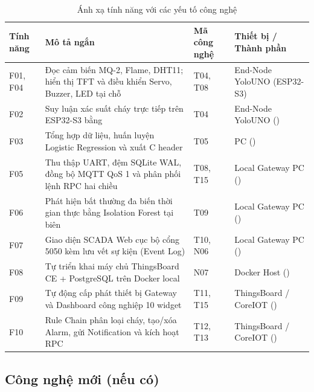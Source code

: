 \begin{table}[htbp]
  \centering
  \caption{Ánh xạ tính năng với các yếu tố công nghệ}
  \label{tab:anh-xa-tinh-nang}
  {\small
  \setlength{\tabcolsep}{4pt}
  \renewcommand{\arraystretch}{1.22}
  \begin{tabularx}{\textwidth}{|C{0.10\textwidth}|Y|C{0.15\textwidth}|L{0.30\textwidth}|}
    \hline
    \textbf{Tính năng} & \textbf{Mô tả ngắn} & \textbf{Mã công nghệ} & \textbf{Thiết bị / Thành phần} \\
    \hline
    F01, F04 & Đọc cảm biến MQ-2, Flame, DHT11; hiển thị TFT và điều khiển Servo, Buzzer, LED tại chỗ & T04, T08 & End-Node YoloUNO (ESP32-S3) \\
    \hline
    F02 & Suy luận xác suất cháy trực tiếp trên ESP32-S3 bằng  & T04 & End-Node YoloUNO () \\
    \hline
    F03 & Tổng hợp dữ liệu, huấn luyện Logistic Regression và xuất C header & T05 & PC () \\
    \hline
    F05 & Thu thập UART, đệm SQLite WAL, đồng bộ MQTT QoS 1 và phân phối lệnh RPC hai chiều & T08, T15 & Local Gateway PC () \\
    \hline
    F06 & Phát hiện bất thường đa biến thời gian thực bằng Isolation Forest tại biên & T09 & Local Gateway PC () \\
    \hline
    F07 & Giao diện SCADA Web cục bộ cổng 5050 kèm lưu vết sự kiện (Event Log) & T10, N06 & Local Gateway PC () \\
    \hline
    F08 & Tự triển khai máy chủ ThingsBoard CE + PostgreSQL trên Docker local & N07 & Docker Host () \\
    \hline
    F09 & Tự động cấp phát thiết bị Gateway và Dashboard công nghiệp 10 widget & T11, T15 & ThingsBoard / CoreIOT () \\
    \hline
    F10 & Rule Chain phân loại cháy, tạo/xóa Alarm, gửi Notification và kích hoạt RPC & T12, T13 & ThingsBoard / CoreIOT () \\
    \hline
  \end{tabularx}
  }
\end{table}

\subsection{Công nghệ mới (nếu có)}
\label{subsec:cong-nghe-moi}

